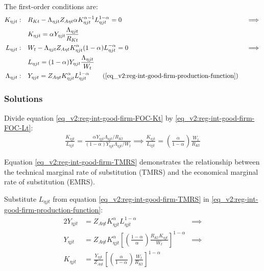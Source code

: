 \documentclass[../thesis.tex]{subfiles}
\begin{document}
The first-order conditions are:
\begin{alignat}{2}
	K_{\eta jt}: \quad & R_{Kt} - \Lambda_{\eta jt} Z_{A\eta t} {\alpha_{}} K_{\eta jt}^{{\alpha_{}}-1} L_{\eta jt}^{1-{\alpha_{}}} = 0 &&\implies \nonumber \\
	& K_{\eta jt} = {\alpha_{}} Y_{\eta jt} \frac{\Lambda_{\eta jt}}{R_{Kt}} \label{eq_v2:reg-int-good-firm-FOC-Kt} \\
	L_{\eta jt}: \quad & W_t - \Lambda_{\eta jt} Z_{A\eta t} K_{\eta jt}^{\alpha_{}} (1-{\alpha_{}}) L_{\eta jt}^{-{\alpha_{}}} = 0 \quad &&\implies \nonumber \\ 
	& L_{\eta jt} = (1-{\alpha_{}}) Y_{\eta jt} \frac{\Lambda_{\eta jt}}{W_t} \label{eq_v2:reg-int-good-firm-FOC-Lt} \\
	\Lambda_{\eta jt}: \quad & Y_{\eta jt} = Z_{A\eta t} K_{\eta jt}^{\alpha_{}} L_{\eta jt}^{1-{\alpha_{}}} \tag{\ref{eq_v2:reg-int-good-firm-production-function}}
\end{alignat}

\subsubsection*{Solutions}

Divide equation \ref{eq_v2:reg-int-good-firm-FOC-Kt} by \ref{eq_v2:reg-int-good-firm-FOC-Lt}:
\begin{align}
	\frac{K_{\eta jt}}{L_{\eta jt}} = \frac{{\alpha_{}} Y_{\eta jt} \Lambda_{\eta jt} /R_{Kt}}{(1-{\alpha_{}}) Y_{\eta jt} \Lambda_{\eta jt} /W_t} \implies
	\frac{K_{\eta jt}}{L_{\eta jt}} = \left( \frac{{\alpha_{}}}{1-{\alpha_{}}} \right) \frac{W_t}{R_{Kt}} \label{eq_v2:reg-int-good-firm-TMRS}
\end{align}

Equation \ref{eq_v2:reg-int-good-firm-TMRS} demonstrates the relationship between the technical marginal rate of substitution (TMRS) and the economical marginal rate of substitution (EMRS). 

Substitute $L_{\eta jt}$ from equation \ref{eq_v2:reg-int-good-firm-TMRS} in \ref{eq_v2:reg-int-good-firm-production-function}:
\begin{alignat}{2}
	Y_{\eta jt} & = Z_{A\eta t} K_{\eta jt}^{\alpha_{}} L_{\eta jt}^{1-{\alpha_{}}} &\implies \nonumber \\
	Y_{\eta jt} & = Z_{A\eta t} K_{\eta jt}^{\alpha_{}} \left[ \left( \frac{1-{\alpha_{}}}{{\alpha_{}}} \right) \frac{R_{Kt} K_{\eta jt}}{W_t} \right]^{1-{\alpha_{}}} &\implies \nonumber \\
	K_{\eta jt} & = \frac{Y_{\eta jt}}{Z_{A\eta t}} \left[ \left( \frac{{\alpha_{}}}{1-{\alpha_{}}} \right) \frac{W_t}{R_{Kt}}\right]^{1-{\alpha_{}}} \label{eq_v2:reg-int-good-firm-Kt-demand}
\end{alignat}
\end{document}
